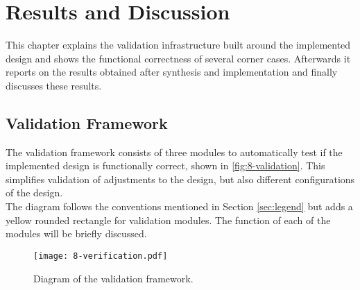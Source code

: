 \chapter{Results and Discussion}
This chapter explains the validation infrastructure built around the implemented design and shows the functional correctness of several corner cases. Afterwards it reports on the results obtained after synthesis and implementation and finally discusses these results.





\section{Validation Framework}
\label{sec:verif}
The validation framework consists of three modules to automatically test if the implemented design is functionally correct, shown in \autoref{fig:8-validation}. This simplifies validation of adjustments to the design, but also different configurations of the design.\\
The diagram follows the conventions mentioned in Section \ref{sec:legend} but adds a yellow rounded rectangle for validation modules. The function of each of the modules will be briefly discussed.

\begin{figure}[H]
  \centering
  \texttt{[image: 8-verification.pdf]}
  \caption{Diagram of the validation framework.}
  \label{fig:8-validation}
\end{figure}




